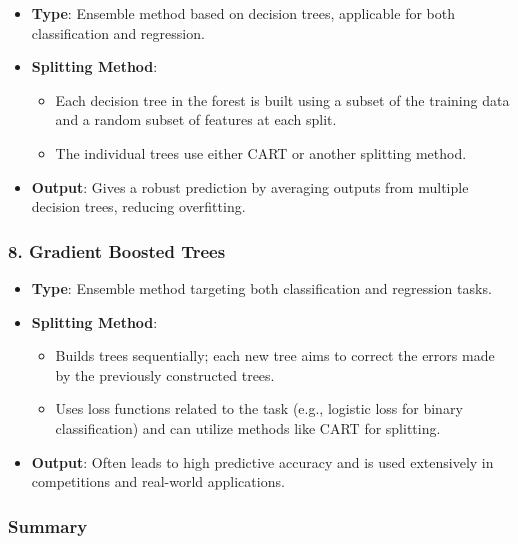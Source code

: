 \documentclass[12pt]{book}
\providecommand{\tightlist}{%
  \setlength{\itemsep}{0pt}\setlength{\parskip}{0pt}}
\begin{document}
\begin{itemize}
\tightlist
\item
  \textbf{Type}: Ensemble method based on decision trees, applicable for
  both classification and regression.
\item
  \textbf{Splitting Method}:

  \begin{itemize}
  \tightlist
  \item
    Each decision tree in the forest is built using a subset of the
    training data and a random subset of features at each split.
  \item
    The individual trees use either CART or another splitting method.
  \end{itemize}
\item
  \textbf{Output}: Gives a robust prediction by averaging outputs from
  multiple decision trees, reducing overfitting.
\end{itemize}

\subsubsection{8. Gradient Boosted Trees}\label{gradient-boosted-trees}

\begin{itemize}
\tightlist
\item
  \textbf{Type}: Ensemble method targeting both classification and
  regression tasks.
\item
  \textbf{Splitting Method}:

  \begin{itemize}
  \tightlist
  \item
    Builds trees sequentially; each new tree aims to correct the errors
    made by the previously constructed trees.
  \item
    Uses loss functions related to the task (e.g., logistic loss for
    binary classification) and can utilize methods like CART for
    splitting.
  \end{itemize}
\item
  \textbf{Output}: Often leads to high predictive accuracy and is used
  extensively in competitions and real-world applications.
\end{itemize}

\subsubsection{Summary}\label{summary}
\end{document}
